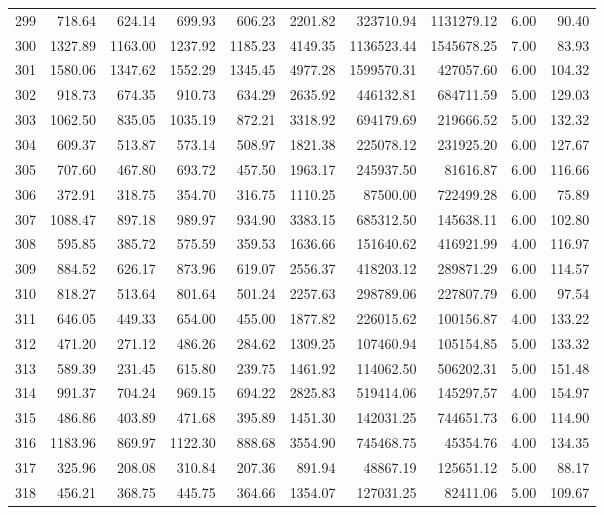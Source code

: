 \begin{tabular}{lrrrrrrrrr}
299 & 718.64 & 624.14 & 699.93 & 606.23 & 2201.82 & 323710.94 & 1131279.12 & 6.00 & 90.40 \\
300 & 1327.89 & 1163.00 & 1237.92 & 1185.23 & 4149.35 & 1136523.44 & 1545678.25 & 7.00 & 83.93 \\
301 & 1580.06 & 1347.62 & 1552.29 & 1345.45 & 4977.28 & 1599570.31 & 427057.60 & 6.00 & 104.32 \\
302 & 918.73 & 674.35 & 910.73 & 634.29 & 2635.92 & 446132.81 & 684711.59 & 5.00 & 129.03 \\
303 & 1062.50 & 835.05 & 1035.19 & 872.21 & 3318.92 & 694179.69 & 219666.52 & 5.00 & 132.32 \\
304 & 609.37 & 513.87 & 573.14 & 508.97 & 1821.38 & 225078.12 & 231925.20 & 6.00 & 127.67 \\
305 & 707.60 & 467.80 & 693.72 & 457.50 & 1963.17 & 245937.50 & 81616.87 & 6.00 & 116.66 \\
306 & 372.91 & 318.75 & 354.70 & 316.75 & 1110.25 & 87500.00 & 722499.28 & 6.00 & 75.89 \\
307 & 1088.47 & 897.18 & 989.97 & 934.90 & 3383.15 & 685312.50 & 145638.11 & 6.00 & 102.80 \\
308 & 595.85 & 385.72 & 575.59 & 359.53 & 1636.66 & 151640.62 & 416921.99 & 4.00 & 116.97 \\
309 & 884.52 & 626.17 & 873.96 & 619.07 & 2556.37 & 418203.12 & 289871.29 & 6.00 & 114.57 \\
310 & 818.27 & 513.64 & 801.64 & 501.24 & 2257.63 & 298789.06 & 227807.79 & 6.00 & 97.54 \\
311 & 646.05 & 449.33 & 654.00 & 455.00 & 1877.82 & 226015.62 & 100156.87 & 4.00 & 133.22 \\
312 & 471.20 & 271.12 & 486.26 & 284.62 & 1309.25 & 107460.94 & 105154.85 & 5.00 & 133.32 \\
313 & 589.39 & 231.45 & 615.80 & 239.75 & 1461.92 & 114062.50 & 506202.31 & 5.00 & 151.48 \\
314 & 991.37 & 704.24 & 969.15 & 694.22 & 2825.83 & 519414.06 & 145297.57 & 4.00 & 154.97 \\
315 & 486.86 & 403.89 & 471.68 & 395.89 & 1451.30 & 142031.25 & 744651.73 & 6.00 & 114.90 \\
316 & 1183.96 & 869.97 & 1122.30 & 888.68 & 3554.90 & 745468.75 & 45354.76 & 4.00 & 134.35 \\
317 & 325.96 & 208.08 & 310.84 & 207.36 & 891.94 & 48867.19 & 125651.12 & 5.00 & 88.17 \\
318 & 456.21 & 368.75 & 445.75 & 364.66 & 1354.07 & 127031.25 & 82411.06 & 5.00 & 109.67 \\

\end{tabular}
